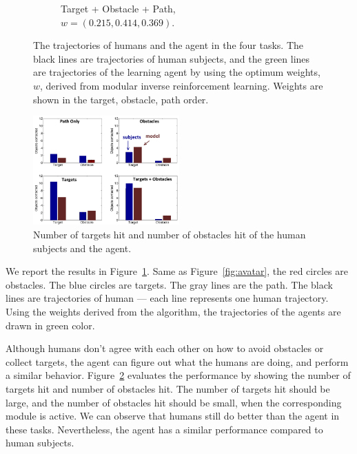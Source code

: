\begin{figure}[h]
\begin{subfigure}[b]{0.24\textwidth}
\caption{Target + Obstacle + Path, \\$w = (0.215, 0.414, 0.369)$. }
\end{subfigure}
\caption{The trajectories of humans and the agent in the four tasks. The
black lines are trajectories of human subjects, and the green lines are
trajectories of the learning agent by using the optimum weights, $w$, derived
from modular inverse reinforcement learning. Weights are shown in the target,
obstacle, path order.}

\label{fig:exp}
\end{figure}

\begin{figure}[h]
\centering
\includegraphics[width=0.5\textwidth]{contactStats.png}
\caption{Number of targets hit and number of obstacles hit of the human subjects
and the agent.}
\label{fig:stats}
\end{figure}

We report the results in Figure~\ref{fig:exp}. Same as Figure~\ref{fig:avatar},
the red circles are obstacles. The blue circles are targets. The gray lines are
the path. The black lines are trajectories of human --- each line represents one
human trajectory.
Using the weights derived from the algorithm, the trajectories of the agents are
drawn in green color.

Although humans don't agree with each other on how to avoid obstacles or collect
targets, the agent can figure out what the humans are doing, and perform a
similar behavior. Figure~\ref{fig:stats} evaluates the
performance by showing the number of targets hit and number of obstacles hit.
The number of targets hit should be large, and the number of obstacles hit
should be small, when the corresponding module is active.
We can observe that humans still do better than the agent in these tasks.
Nevertheless, the agent has a similar performance compared to human subjects.

